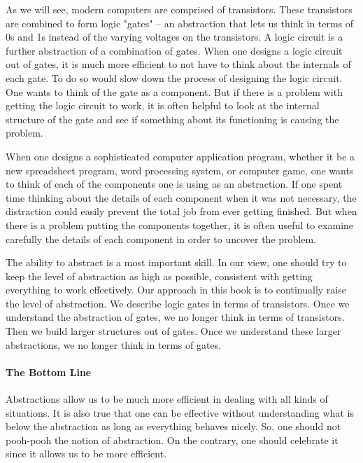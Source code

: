 \documentclass{patt}
\begin{document}
As we will see, modern computers are comprised of transistors. These 
transistors are combined to form logic "gates" -- an abstraction that lets us 
think in terms of 0s and 1s instead of the varying voltages on the 
transistors.  A logic circuit is a further abstraction of a combination of 
gates.  When one designs a logic circuit out of gates, it is much more
efficient to not have to think about the internals of each gate.  To
do so would slow down the process of designing the logic circuit.  One
wants to think of the gate as a component.  But if there is a problem
with getting the logic circuit to work, it is often helpful to look at
the internal structure of the gate and see if something about its
functioning is causing the problem.

When one designs a sophisticated computer application program, whether
it be a new spreadsheet program, word processing system, or computer
game, one wants to think of each of the components one is using as an
abstraction.  If one spent time thinking about the details of each 
component when it was not necessary, the distraction could easily
prevent the total job from ever getting finished.  But when there is a
problem putting the components together, it is often useful to examine
carefully the details of each component in order to uncover the
problem.

The ability to abstract is a most important skill.  In our
view, one should try to keep the level of abstraction as high as possible,
consistent with getting everything to work effectively.  Our approach in this
book is to continually raise the level of abstraction.  We describe logic
gates in terms of transistors.  Once we understand the abstraction of gates,
we no longer think in terms of transistors.  Then we build larger structures
out of gates.  Once we understand these larger abstractions, we no longer think
in terms of gates.

\paragraph{The Bottom Line}

Abstractions allow us to be much more efficient in dealing
with all kinds of situations.  It is also true that one can be effective
without understanding what is below the abstraction as long as everything
behaves nicely.  So, one should not pooh-pooh the notion of abstraction.  On the
contrary, one should celebrate it since it allows us to be more efficient.
\end{document}
